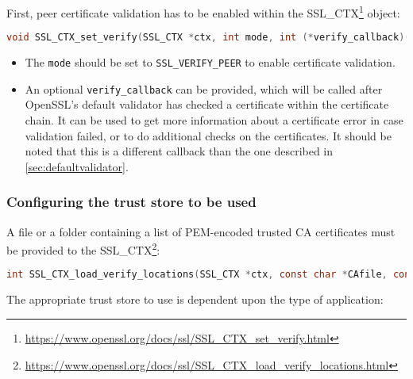 \documentclass{article}
\begin{document}
First, peer certificate validation has to be enabled within the 
SSL\_CTX\footnote{\url{https://www.openssl.org/docs/ssl/SSL_CTX_set_verify.html}} 
object:

\begin{lstlisting}[style=code,language=C,numbers=none,caption={}]
void SSL_CTX_set_verify(SSL_CTX *ctx, int mode, int (*verify_callback)(int, X509_STORE_CTX *));
\end{lstlisting}

\begin{itemize}

    \item The {\tt mode} should be set to {\tt SSL\_VERIFY\_PEER} to enable certificate 
        validation.

    \item An optional {\tt verify\_callback} can be provided, which will be called
        after OpenSSL's default validator has checked a certificate within the
        certificate chain. It can be used to get more information about a certificate
        error in case validation failed, or to do additional checks on the
        certificates. It should be noted that this is a different callback than the
        one described in \vref{sec:defaultvalidator}.

\end{itemize}


\subsubsection{Configuring the trust store to be used}

A file or a folder containing a list of PEM-encoded trusted CA certificates
must be provided to the SSL\_CTX\footnote{\url{https://www.openssl.org/docs/ssl/SSL_CTX_load_verify_locations.html}}:

\begin{lstlisting}[style=code,language=C,numbers=none,caption={}]
int SSL_CTX_load_verify_locations(SSL_CTX *ctx, const char *CAfile, const char *CApath);
\end{lstlisting}

The appropriate trust store to use is dependent upon the type of application:
\end{document}
